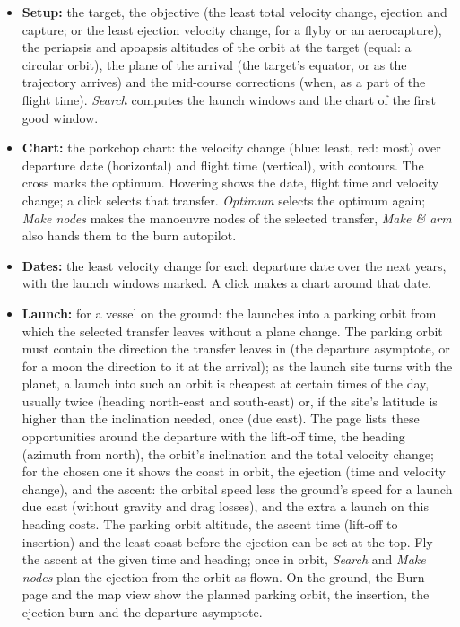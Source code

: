 \documentclass[Orbiter User Manual.tex]{subfiles}
\begin{document}
\begin{itemize}
\item \textbf{Setup:} the target, the objective (the least total velocity change, ejection and capture; or the least ejection velocity change, for a flyby or an aerocapture), the periapsis and apoapsis altitudes of the orbit at the target (equal: a circular orbit), the plane of the arrival (the target's equator, or as the trajectory arrives) and the mid-course corrections (when, as a part of the flight time). \textit{Search} computes the launch windows and the chart of the first good window.
\item \textbf{Chart:} the porkchop chart: the velocity change (blue: least, red: most) over departure date (horizontal) and flight time (vertical), with contours. The cross marks the optimum. Hovering shows the date, flight time and velocity change; a click selects that transfer. \textit{Optimum} selects the optimum again; \textit{Make nodes} makes the manoeuvre nodes of the selected transfer, \textit{Make \& arm} also hands them to the burn autopilot.
\item \textbf{Dates:} the least velocity change for each departure date over the next years, with the launch windows marked. A click makes a chart around that date.
\item \textbf{Launch:} for a vessel on the ground: the launches into a parking orbit from which the selected transfer leaves without a plane change. The parking orbit must contain the direction the transfer leaves in (the departure asymptote, or for a moon the direction to it at the arrival); as the launch site turns with the planet, a launch into such an orbit is cheapest at certain times of the day, usually twice (heading north-east and south-east) or, if the site's latitude is higher than the inclination needed, once (due east). The page lists these opportunities around the departure with the lift-off time, the heading (azimuth from north), the orbit's inclination and the total velocity change; for the chosen one it shows the coast in orbit, the ejection (time and velocity change), and the ascent: the orbital speed less the ground's speed for a launch due east (without gravity and drag losses), and the extra a launch on this heading costs. The parking orbit altitude, the ascent time (lift-off to insertion) and the least coast before the ejection can be set at the top. Fly the ascent at the given time and heading; once in orbit, \textit{Search} and \textit{Make nodes} plan the ejection from the orbit as flown. On the ground, the Burn page and the map view show the planned parking orbit, the insertion, the ejection burn and the departure asymptote.

\end{itemize}
\end{document}
